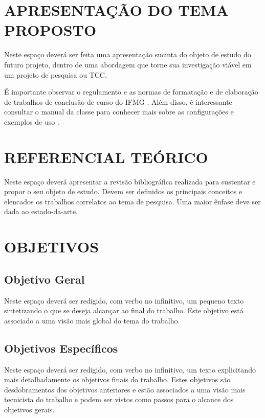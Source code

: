 \documentclass[artigo]{iftex2024}
\begin{document}
\maketitle

\section{APRESENTAÇÃO DO TEMA PROPOSTO}

Neste espaço deverá ser feita uma apresentação sucinta do objeto de estudo do futuro projeto, dentro de uma abordagem que torne sua investigação viável em um projeto de pesquisa ou TCC.

É importante observar o regulamento e as normas de formatação e de elaboração de trabalhos de conclusão de curso do IFMG \cite{ifmg:2020:manual,ifmg:2021:tcc}.
Além disso, é interessante consultar o manual da classe {\iftex} para conhecer mais sobre as configurações e exemplos de uso \cite{ribeiro:2024:iftex}.

\section{REFERENCIAL TEÓRICO}

Neste espaço deverá apresentar a revisão bibliográfica realizada para sustentar e propor o seu objeto de estudo. Devem ser definidos os principais conceitos e elencados os trabalhos correlatos ao tema de pesquisa. Uma maior ênfase deve ser dada ao estado-da-arte.

\section{OBJETIVOS}

\subsection{Objetivo Geral}

Neste espaço deverá ser redigido, com verbo no infinitivo, um pequeno texto sintetizando o que se deseja alcançar ao final do trabalho. Este objetivo está associado a uma visão mais global do tema do trabalho.

\subsection{Objetivos Específicos}

Neste espaço deverá ser redigido, com verbo no infinitivo, um texto explicitando mais detalhadamente os objetivos finais do trabalho. Estes objetivos são desdobramentos dos objetivos anteriores e estão associados a uma visão mais tecnicista do trabalho e podem ser vistos como passos para o alcance dos objetivos gerais.
\end{document}
